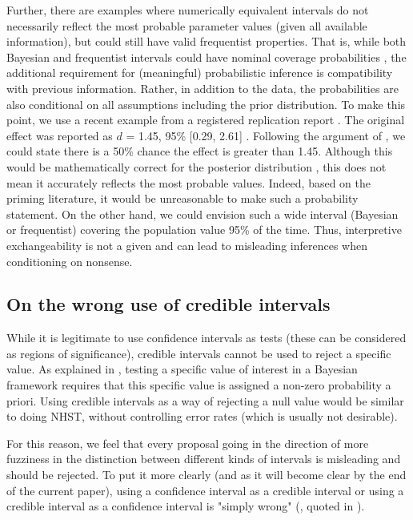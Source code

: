 \documentclass[a4paper,man,natbib,floatsintext,donotrepeattitle]{apa6}
\begin{document}
 Further, there are examples where numerically equivalent intervals do not necessarily reflect the most probable parameter values (given all available information), but could still have valid frequentist properties. That is, while both Bayesian and frequentist intervals could have nominal coverage probabilities \citep{albers_credible_2018}, the additional requirement for (meaningful) probabilistic inference is compatibility with previous information. Rather, in addition to the data, the probabilities are also conditional on all assumptions including the prior distribution. To make this point, we use a recent example from a registered replication report \citep{verschuere_registered_2018}. The original effect was reported as $d$ = 1.45, 95\% [0.29, 2.61] \citep{mazar_dishonesty_2008}. Following the argument of \cite{albers_credible_2018}, we could state there is a 50\% chance the effect is greater than 1.45. Although this would be mathematically correct for the posterior distribution \citep{gelman_p_2013}, this does not mean it accurately reflects the most probable values. Indeed, based on the priming literature, it would be unreasonable to make such a probability statement. On the other hand, we could envision such a wide interval (Bayesian or frequentist) covering the population value 95\% of the time. Thus, interpretive exchangeability is not a given and can lead to misleading inferences when conditioning on nonsense.

\subsection{On the wrong use of credible intervals}

While it is legitimate to use confidence intervals as tests (these can be considered as regions of significance), credible intervals cannot be used to reject a specific value. As explained in \cite{morey_fallacy_2015}, testing a specific value of interest in a Bayesian framework requires that this specific value is assigned a non-zero probability a priori. Using credible intervals as a way of rejecting a null value would be similar to doing NHST, without controlling error rates (which is usually not desirable).

For this reason, we feel that every proposal going in the direction of more fuzziness in the distinction between different kinds of intervals is misleading and should be rejected. To put it more clearly (and as it will become clear by the end of the current paper), using a confidence interval as a credible interval or using a credible interval as a confidence interval is "simply wrong" (\citealp{berger_bayes_2006}, quoted in \citealp{morey_fallacy_2015}).
\end{document}
